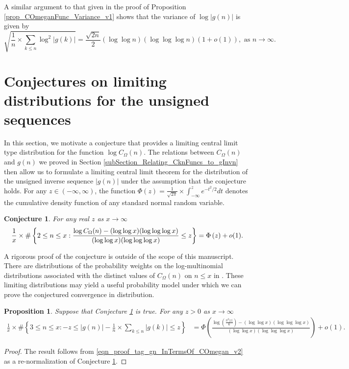 \documentclass[11pt,reqno,a4letter]{article}
\newcommand{\hlocalref}[1]{\hyperref[#1]{\ref{#1}}}
\numberwithin{equation}{section}
\numberwithin{figure}{section}
\numberwithin{table}{section}
\let\citep\cite
\newcommand{\cf}{\textit{cf.\ }}
\theoremstyle{plain}
\newtheorem{conjecture}[theorem]{Conjecture}
\newtheorem{prop}[theorem]{Proposition}
\numberwithin{theorem}{section}
\theoremstyle{definition}
\begin{document}
A similar argument to that given in the proof of 
Proposition \hlocalref{prop_COmeganFunc_Variance_v1} 
shows that the variance of $\log |g(n)|$ is given by 
\[
\sqrt{\frac{1}{n} \times \sum_{k \leq n} \log^2 |g(k)|} = 
     \frac{\sqrt{2n}}{2} (\log\log n) (\log\log\log n) (1+o(1)), 
     \text{ as } n \rightarrow \infty. 
\]

\section{Conjectures on limiting distributions for the unsigned sequences} 
\label{subSection_ErdosKacTheorem_Analogs} 

In this section, we motivate a conjecture that provides a limiting 
central limit type distribution for the function $\log C_{\Omega}(n)$. 
The relations between $C_{\Omega}(n)$ and $g(n)$ we proved in 
Section \hlocalref{subSection_Relating_CknFuncs_to_gInvn} then 
allow us to formulate a limiting central limit theorem for the distribution 
of the unsigned inverse sequence $|g(n)|$ under the assumption that 
the conjecture holds. For any $z \in (-\infty, \infty)$, the function 
$\Phi(z) = \frac{1}{\sqrt{2\pi}} \times \int_{-\infty}^{z} e^{-t^2/2} dt$ denotes the 
cumulative density function of any standard normal random variable. 

\begin{conjecture}
\label{conj_DetFormOfEKTypeThmForCOmegan_v1} 
For any real $z$ as $x \rightarrow \infty$ 
\begin{equation} 
\notag
\frac{1}{x} \times \#\left\{2 \leq n \leq x: 
	\frac{\log C_{\Omega}(n) - 
	(\log\log x) (\log\log\log x)}{(\log\log x)(\log\log\log x)} \leq z\right\} = 
     \Phi\left(z\right) + o(1). 
\end{equation}
\end{conjecture} 

A rigorous proof of the conjecture is outside of the scope of this manuscript. 
There are distributions of the probability weights on the 
log-multinomial distributions associated 
with the distinct values of $C_{\Omega}(n)$ on $n \leq x$ 
in \citep[\cf \S 1.2]{LOG-COMB-STRUCTS-BOOK}. 
These limiting distributions may yield a useful probability 
model under which we can prove the conjectured convergence in distribution.

\begin{prop}
\label{cor_CLT_VII} 
Suppose that Conjecture \hlocalref{conj_DetFormOfEKTypeThmForCOmegan_v1} is true. 
For any $z > 0$ as $x \rightarrow \infty$ 
\begin{align*} 
\frac{1}{x} \times \#\left\{3 \leq n \leq x: -z \leq |g(n)| - 
     \frac{1}{n} \times \sum_{k \leq n} |g(k)| \leq z\right\} & = 
	\Phi\left(\frac{\log\left(\frac{\pi^2 |z|}{6}\right)-(\log\log x) (\log\log\log x)}{ 
	(\log\log x)(\log\log\log x)}\right) + o(1).
\end{align*} 
\end{prop} 
\begin{proof} 
The result follows from \eqref{eqn_proof_tag_gn_InTermsOf_COmegan_v2} 
as a re-normalization of Conjecture \hlocalref{conj_DetFormOfEKTypeThmForCOmegan_v1}. 
\end{proof} 
\end{document}
